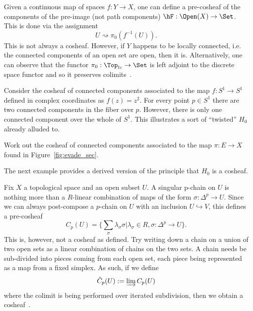 \begin{defn}
	Given a continuous map of spaces $f:Y\to X$, one can define a pre-cosheaf of the components of the pre-image (not path components) $\hF:\Open(X)\to\Set$. This is done via the assignment
	\[
	U \rightsquigarrow \pi_0(f^{-1}(U)).
	\]
	This is not always a cosheaf. However, if $Y$ happens to be locally connected, i.e. the connected components of an open set are open, then it is. Alternatively, one can observe that the functor $\pi_0:\Top_{lc}\to\Set$ is left adjoint to the discrete space functor and so it preserves colimits~\cite{woolf}.
\end{defn}

\begin{ex}
Consider the cosheaf of connected components associated to the map $f:S^1\to S^1$ defined in complex coordinates as $f(z)=z^2$. For every point $p\in S^1$ there are two connected components in the fiber over $p$. However, there is only one connected component over the whole of $S^1$. This illustrates a sort of ``twisted'' $H_0$ already alluded to.
\end{ex}

\begin{exr}
Work out the cosheaf of connected components associated to the map $\pi:E\to X$ found in Figure~\ref{fig:evade_sec}.
\end{exr}

The next example provides a derived version of the principle that $H_0$ is a cosheaf.

\begin{ex}
	Fix $X$ a topological space and an open subset $U$. A singular p-chain on $U$ is nothing more than a $R$-linear combination of maps of the form $\sigma:\Delta^p\to U$. Since we can always post-compose a $p$-chain on $U$ with an inclusion $U\hookrightarrow V$, this defines a pre-cosheaf
	\[
	C_p(U)=\{\sum_{\sigma} \lambda_{\sigma}\sigma | \lambda_{\sigma}\in R, \sigma:\Delta^p\to U\}.
	\]
	This is, however, not a cosheaf as defined. Try writing down a chain on a union of two open sets as a linear combination of chains on the two sets.
	 A chain needs be sub-divided into pieces coming from each open set, each piece being represented as a map from a fixed simplex. As such, if we define
	\[
	\hat{C}_p(U):=\varinjlim C_p(U)
	\]
	where the colimit is being performed over iterated subdivision, then we obtain a cosheaf~\cite{Bredon}.
\end{ex}

